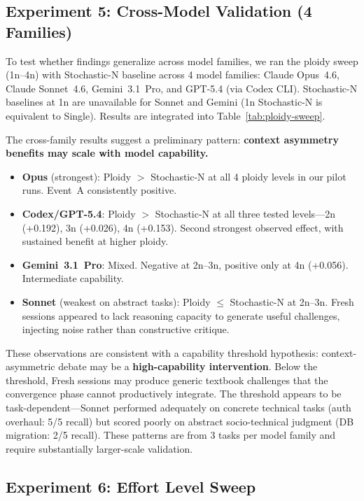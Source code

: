 \documentclass[11pt]{article}
\begin{document}
\subsection{Experiment 5: Cross-Model Validation (4 Families)}
\label{sec:cross-model}

To test whether findings generalize across model families, we ran the ploidy sweep (1n--4n) with Stochastic-N baseline across 4 model families: Claude Opus~4.6, Claude Sonnet~4.6, Gemini~3.1~Pro, and GPT-5.4 (via Codex CLI). Stochastic-N baselines at 1n are unavailable for Sonnet and Gemini (1n Stochastic-N is equivalent to Single). Results are integrated into Table~\ref{tab:ploidy-sweep}.

The cross-family results suggest a preliminary pattern: \textbf{context asymmetry benefits may scale with model capability.}

\begin{itemize}[leftmargin=1.5em]
  \item \textbf{Opus} (strongest): Ploidy $>$ Stochastic-N at all 4 ploidy levels in our pilot runs. Event~A consistently positive.
  \item \textbf{Codex/GPT-5.4}: Ploidy $>$ Stochastic-N at all three tested levels---2n (+0.192), 3n (+0.026), 4n (+0.153). Second strongest observed effect, with sustained benefit at higher ploidy.
  \item \textbf{Gemini~3.1~Pro}: Mixed. Negative at 2n--3n, positive only at 4n (+0.056). Intermediate capability.
  \item \textbf{Sonnet} (weakest on abstract tasks): Ploidy $\leq$ Stochastic-N at 2n--3n. Fresh sessions appeared to lack reasoning capacity to generate useful challenges, injecting noise rather than constructive critique.
\end{itemize}

These observations are consistent with a capability threshold hypothesis: context-asymmetric debate may be a \textbf{high-capability intervention}. Below the threshold, Fresh sessions may produce generic textbook challenges that the convergence phase cannot productively integrate. The threshold appears to be task-dependent---Sonnet performed adequately on concrete technical tasks (auth overhaul: 5/5 recall) but scored poorly on abstract socio-technical judgment (DB migration: 2/5 recall). These patterns are from 3 tasks per model family and require substantially larger-scale validation.

\subsection{Experiment 6: Effort Level Sweep}
\label{sec:effort-sweep}
\end{document}
